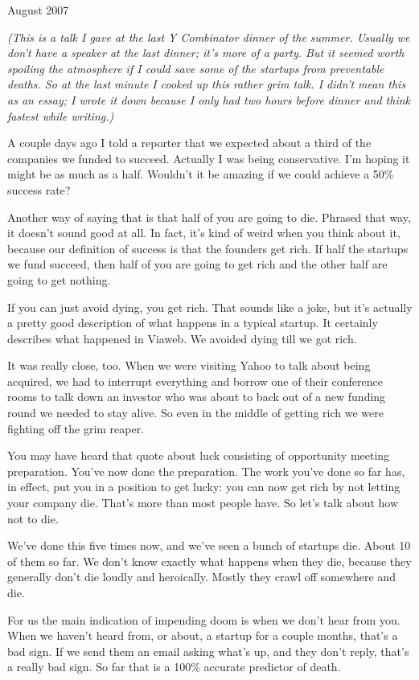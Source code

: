 August 2007

\emph{(This is a talk I gave at the last Y Combinator dinner of the
summer. Usually we don't have a speaker at the last dinner; it's more of
a party. But it seemed worth spoiling the atmosphere if I could save
some of the startups from preventable deaths. So at the last minute I
cooked up this rather grim talk. I didn't mean this as an essay; I wrote
it down because I only had two hours before dinner and think fastest
while writing.)}

A couple days ago I told a reporter that we expected about a third of
the companies we funded to succeed. Actually I was being conservative.
I'm hoping it might be as much as a half. Wouldn't it be amazing if we
could achieve a 50\% success rate?

Another way of saying that is that half of you are going to die. Phrased
that way, it doesn't sound good at all. In fact, it's kind of weird when
you think about it, because our definition of success is that the
founders get rich. If half the startups we fund succeed, then half of
you are going to get rich and the other half are going to get nothing.

If you can just avoid dying, you get rich. That sounds like a joke, but
it's actually a pretty good description of what happens in a typical
startup. It certainly describes what happened in Viaweb. We avoided
dying till we got rich.

It was really close, too. When we were visiting Yahoo to talk about
being acquired, we had to interrupt everything and borrow one of their
conference rooms to talk down an investor who was about to back out of a
new funding round we needed to stay alive. So even in the middle of
getting rich we were fighting off the grim reaper.

You may have heard that quote about luck consisting of opportunity
meeting preparation. You've now done the preparation. The work you've
done so far has, in effect, put you in a position to get lucky: you can
now get rich by not letting your company die. That's more than most
people have. So let's talk about how not to die.

We've done this five times now, and we've seen a bunch of startups die.
About 10 of them so far. We don't know exactly what happens when they
die, because they generally don't die loudly and heroically. Mostly they
crawl off somewhere and die.

For us the main indication of impending doom is when we don't hear from
you. When we haven't heard from, or about, a startup for a couple
months, that's a bad sign. If we send them an email asking what's up,
and they don't reply, that's a really bad sign. So far that is a 100\%
accurate predictor of death.

